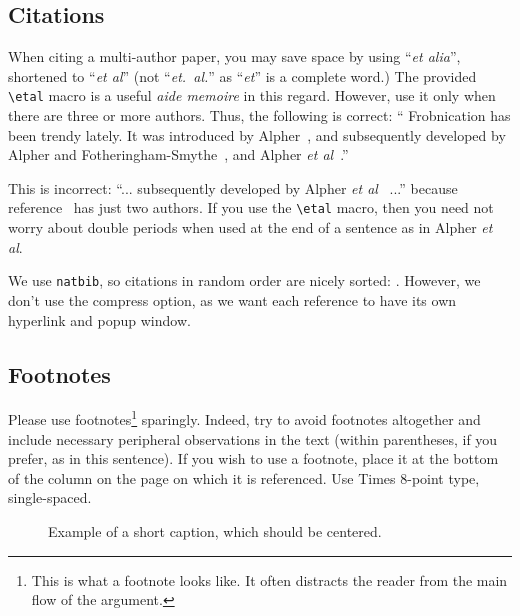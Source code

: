 \documentclass{bmvc2k}
\def\etal{\emph{et al}\bmvaOneDot}
\begin{document}
\subsection{Citations}
When citing a multi-author paper, you may save space by using ``{\em et
alia}'', shortened to ``\etal'' (not ``{\em et.\ al.}'' as ``{\em et}'' is
a complete word.)  The provided \verb'\etal' macro is a useful {\em aide
memoire} in this regard.  However, use it only when there are three or more
authors.  Thus, the following is correct: `` Frobnication has been trendy
lately.  It was introduced by Alpher~\cite{Alpher02}, and subsequently
developed by Alpher and Fotheringham-Smythe~\cite{Alpher03}, and Alpher
\etal~\cite{Alpher04}.''

This is incorrect: ``... subsequently developed by Alpher \etal~\cite{Alpher03} ...''
because reference~\cite{Alpher03} has just two authors.  If you use the
\verb'\etal' macro, then you need not worry about double periods
when used at the end of a sentence as in Alpher \etal.

We use {\tt natbib}, so citations in random order are nicely sorted:
 \cite{Alpher03,Alpher02,Authors06b,Authors06}.  However, we don't use the
compress option, as we want each reference to have its own hyperlink and
popup window.

\subsection{Footnotes}

Please use footnotes\footnote {This is what a footnote looks like.  It
often distracts the reader from the main flow of the argument.} sparingly.
Indeed, try to avoid footnotes altogether and include necessary peripheral
observations in 
the text (within parentheses, if you prefer, as in this sentence).  If you
wish to use a footnote, place it at the bottom of the column on the page on
which it is referenced. Use Times 8-point type, single-spaced.


\begin{figure}
\begin{center}
\fbox{\rule{0pt}{2in} \rule{.9\linewidth}{0pt}}
\end{center}
   \caption{Example of a short caption, which should be centered.}
\label{fig:short}
\end{figure}
\end{document}
